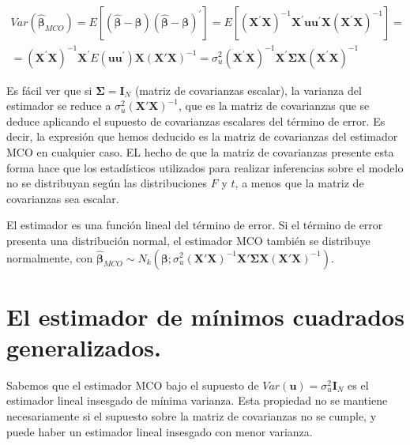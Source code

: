 \[
\begin{array}{c}
Var\left(\hat{\boldsymbol{\beta}}_{MCO}\right)=E\left[\left(\hat{\boldsymbol{\beta}}-\boldsymbol{\beta}\right)\left(\hat{\boldsymbol{\beta}}-\boldsymbol{\beta}\right)^{\prime}\right]=E\left[\left(\boldsymbol{X}^{\prime}\boldsymbol{X}\right)^{-1}\boldsymbol{X}^{\prime}\boldsymbol{u}\boldsymbol{u}^{\prime}\boldsymbol{X}\left(\boldsymbol{X}^{\prime}\boldsymbol{X}\right)^{-1}\right]=\\
=\left(\boldsymbol{X}^{\prime}\boldsymbol{X}\right)^{-1}\boldsymbol{X}^{\prime}E\left(\boldsymbol{u}\boldsymbol{u}^{\prime}\right)\boldsymbol{X}\left(\boldsymbol{X}'\boldsymbol{X}\right)^{-1}=\sigma_{u}^{2}\left(\boldsymbol{X}^{\prime}\boldsymbol{X}\right)^{-1}\boldsymbol{X}^{\prime}\boldsymbol{\Sigma}\boldsymbol{X}\left(\boldsymbol{X}^{\prime}\boldsymbol{X}\right)^{-1}
\end{array}
\]


Es f\'acil ver que si $\boldsymbol{\Sigma}=\boldsymbol{I}_{N}$ (matriz
de covarianzas escalar), la varianza del estimador se reduce a $\sigma_{u}^{2}\left(\boldsymbol{X}'\boldsymbol{X}\right)^{-1}$,
que es la matriz de covarianzas que se deduce aplicando el supuesto
de covarianzas escalares del t\'ermino de error. Es decir, la expresi\'on
que hemos deducido es la matriz de covarianzas del estimador MCO en
cualquier caso. EL hecho de que la matriz de covarianzas presente
esta forma hace que los estad\'isticos utilizados para realizar inferencias
sobre el modelo no se distribuyan seg\'un las distribuciones $F$ y
$t$, a menos que la matriz de covarianzas sea escalar.

El estimador es una funci\'on lineal del t\'ermino de error. Si el t\'ermino
de error presenta una distribuci\'on normal, el estimador MCO tambi\'en
se distribuye normalmente, con $\hat{\boldsymbol{\beta}}_{MCO}\sim N_{k}\left(\boldsymbol{\beta};\sigma_{u}^{2}\left(\boldsymbol{X}'\boldsymbol{X}\right)^{-1}\boldsymbol{X}'\boldsymbol{\Sigma}\boldsymbol{X}\left(\boldsymbol{X}'\boldsymbol{X}\right)^{-1}\right)$.


\section{El estimador de m\'inimos cuadrados generalizados.}

Sabemos que el estimador MCO bajo el supuesto de $Var\left(\boldsymbol{u}\right)=\sigma_{u}^{2}\boldsymbol{I}_{N}$
es el estimador lineal insesgado de m\'inima varianza. Esta propiedad
no se mantiene necesariamente si el supuesto sobre la matriz de covarianzas
no se cumple, y puede haber un estimador lineal insesgado con menor
varianza.

